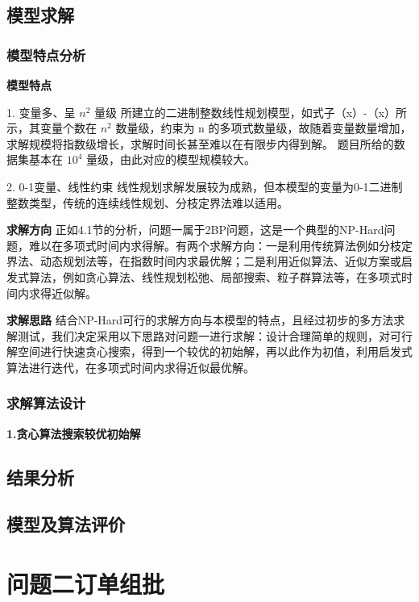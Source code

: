 \documentclass[bwprint]{gmcmthesis}
\begin{document}
\subsection{模型求解}
	
\subsubsection{模型特点分析}
	\textbf{模型特点} 
	
	1. 变量多、呈 $ n^2 $ 量级 \quad 所建立的二进制整数线性规划模型，如式子（x）-（x）所示，其变量个数在 $ n^2 $ 数量级，约束为 n 的多项式数量级，故随着变量数量增加，求解规模将指数级增长，求解时间长甚至难以在有限步内得到解。 题目所给的数据集基本在 $ 10^4 $ 量级，由此对应的模型规模较大。
	
	2. 0-1变量、线性约束 \quad	线性规划求解发展较为成熟，但本模型的变量为0-1二进制整数类型，传统的连续线性规划、分枝定界法难以适用。
	
	\textbf{求解方向} \quad 正如4.1节的分析，问题一属于2BP问题，这是一个典型的NP-Hard问题，难以在多项式时间内求得解。有两个求解方向：一是利用传统算法例如分枝定界法、动态规划法等，在指数时间内求最优解；二是利用近似算法、近似方案或启发式算法，例如贪心算法、线性规划松弛、局部搜索、粒子群算法等，在多项式时间内求得近似解。
	
	\textbf{求解思路} \quad 结合NP-Hard可行的求解方向与本模型的特点，且经过初步的多方法求解测试，我们决定采用以下思路对问题一进行求解：设计合理简单的规则，对可行解空间进行快速贪心搜索，得到一个较优的初始解，再以此作为初值，利用启发式算法进行迭代，在多项式时间内求得近似最优解。


\subsubsection{求解算法设计}

	\textbf{1.贪心算法搜索较优初始解}
	
	


\subsection{结果分析}

\subsection{模型及算法评价}






\section{问题二订单组批}
\end{document}
